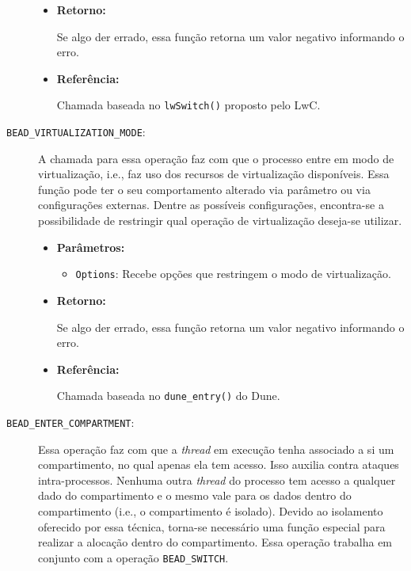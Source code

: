 \begin{description}
\begin{itemize}
    \item \textbf{Retorno:}

Se algo der errado, essa função retorna um valor negativo informando o erro.

    \item \textbf{Referência:}

Chamada baseada no \texttt{lwSwitch()} proposto pelo LwC.

  \end{itemize}

  \item [\texttt{BEAD\_VIRTUALIZATION\_MODE}:]

A chamada para essa operação faz com que o processo entre em modo de
virtualização, i.e., faz uso dos recursos de virtualização disponíveis. Essa função pode ter o seu comportamento alterado via parâmetro ou via
configurações externas. Dentre as possíveis configurações, encontra-se a
possibilidade de restringir qual operação de virtualização deseja-se utilizar.

  \begin{itemize}
    \item \textbf{Parâmetros:}

    \begin{itemize}
      \item \texttt{Options}: Recebe opções que restringem o modo de virtualização.
    \end{itemize}

    \item \textbf{Retorno:}

Se algo der errado, essa função retorna um valor negativo informando o erro.

    \item \textbf{Referência:}

Chamada baseada no \texttt{dune\_entry()} do Dune.

  \end{itemize}

	\item [\texttt{BEAD\_ENTER\_COMPARTMENT}:]

Essa operação faz com que a \emph{thread} em execução tenha associado a si um
compartimento, no qual apenas ela tem acesso. Isso auxilia contra
ataques intra-processos. Nenhuma outra \emph{thread} do processo tem acesso a qualquer
dado do compartimento e o mesmo vale para os dados dentro do compartimento
(i.e., o compartimento é isolado). Devido ao isolamento oferecido por essa
técnica, torna-se necessário uma função especial para realizar a alocação
dentro do compartimento. Essa operação trabalha em conjunto com a operação
\texttt{BEAD\_SWITCH}.


\end{description}
